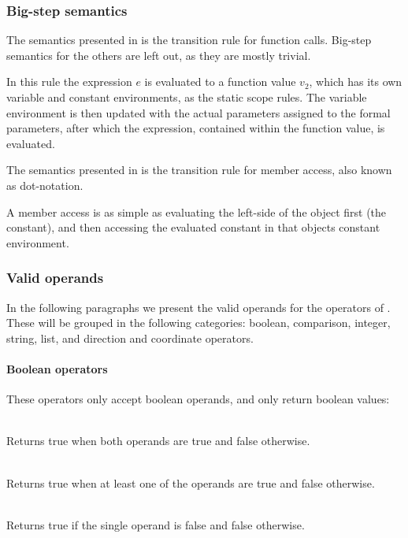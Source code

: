 \subsubsection{Big-step semantics}

The semantics presented in  is the transition
rule for function calls. Big-step semantics for the others are left out,
as they are mostly trivial.



In this rule the expression $e$ is evaluated to a function value $v_2$, which
has its own variable and constant environments, as the static scope rules.
The variable environment is then updated with the actual parameters assigned to
the formal parameters, after which the expression, contained within the function
value, is evaluated.

The semantics presented in  is the transition rule
for member access, also known as dot-notation.



A member access is as simple as evaluating the left-side of the object
first (the constant), and then accessing the evaluated constant in that
objects constant environment.

\subsubsection{Valid operands}
\label{sec:validoperands}
In the following paragraphs we present the valid operands for the operators of
\productname{}. These will be grouped in the following categories: boolean,
comparison, integer, string, list, and direction and coordinate operators.

\paragraph{Boolean operators}

These operators only accept boolean operands, and only return boolean values:

\begin{dlist}
  \item {}\\
    Returns true when both operands are true and false otherwise. 
  \item {}\\
    Returns true when at least one of the operands are true and false otherwise.
  \item {}\\
    Returns true if the single operand is false and false otherwise.
\end{dlist}

